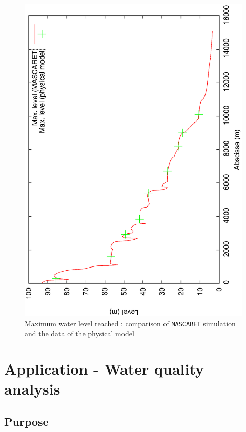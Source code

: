 \documentclass[a4paper,12pt]{article}
\begin{document}
\newpage

\begin{figure}[h]
  \begin{center}
  \includegraphics[scale=0.5,angle=-90]{max_level}
  \caption{Maximum water level reached : comparison of \texttt{MASCARET} simulation and the data of the physical model}
  \label{fig:Maximum-water-level}
  \end{center}
\end{figure}



\section{Application - Water quality analysis}


\subsection{Purpose}
\end{document}
